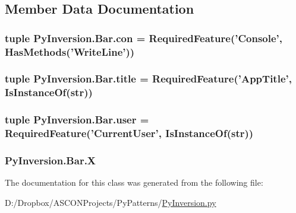 \subsection{Member Data Documentation}
\hypertarget{class_py_inversion_1_1_bar_a8c5a4e5d2e87d13da13ee91237755c68}{
\subsubsection[{con}]{\setlength{\rightskip}{0pt plus 5cm}tuple Py\+Inversion.\+Bar.\+con = {\bf Required\+Feature}('Console', {\bf Has\+Methods}('Write\+Line'))\hspace{0.3cm}{\ttfamily [static]}}}\label{class_py_inversion_1_1_bar_a8c5a4e5d2e87d13da13ee91237755c68}
\hypertarget{class_py_inversion_1_1_bar_a479c6f234727e5c616429c16dd81ac1f}{
\subsubsection[{title}]{\setlength{\rightskip}{0pt plus 5cm}tuple Py\+Inversion.\+Bar.\+title = {\bf Required\+Feature}('App\+Title', {\bf Is\+Instance\+Of}(str))\hspace{0.3cm}{\ttfamily [static]}}}\label{class_py_inversion_1_1_bar_a479c6f234727e5c616429c16dd81ac1f}
\hypertarget{class_py_inversion_1_1_bar_a24c2b32467d45551a2ba8cd20c6749f4}{
\subsubsection[{user}]{\setlength{\rightskip}{0pt plus 5cm}tuple Py\+Inversion.\+Bar.\+user = {\bf Required\+Feature}('Current\+User', {\bf Is\+Instance\+Of}(str))\hspace{0.3cm}{\ttfamily [static]}}}\label{class_py_inversion_1_1_bar_a24c2b32467d45551a2ba8cd20c6749f4}
\hypertarget{class_py_inversion_1_1_bar_a40572207d252c893b1e9b91005dd21b3}{
\subsubsection[{X}]{\setlength{\rightskip}{0pt plus 5cm}Py\+Inversion.\+Bar.\+X}}\label{class_py_inversion_1_1_bar_a40572207d252c893b1e9b91005dd21b3}


The documentation for this class was generated from the following file\+:\begin{DoxyCompactItemize}
\item 
D\+:/\+Dropbox/\+A\+S\+C\+O\+N\+Projects/\+Py\+Patterns/\hyperlink{_py_inversion_8py}{Py\+Inversion.\+py}\end{DoxyCompactItemize}
